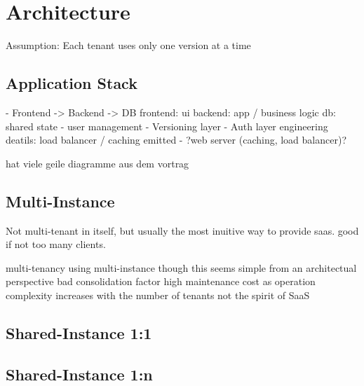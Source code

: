 \section{Architecture}

Assumption:
  Each tenant uses only one version at a time


\subsection{Application Stack}
- Frontend -> Backend -> DB
  frontend: ui
  backend: app / business logic
  db: shared state
  - user management
    - Versioning layer
    - Auth layer
  engineering deatils: load balancer / caching emitted
  - ?web server (caching, load balancer)?


hat viele geile diagramme aus dem vortrag

\subsection{Multi-Instance}

Not multi-tenant in itself, but usually the most inuitive way to provide saas. good if not too many clients.

multi-tenancy using multi-instance
though this seems simple from an architectual perspective
bad consolidation factor
high maintenance cost as operation complexity increases with the number of tenants
not the spirit of SaaS

\subsection{Shared-Instance 1:1}

\subsection{Shared-Instance 1:n}
